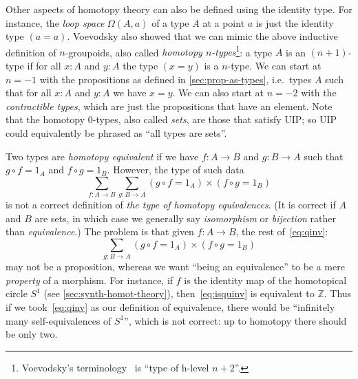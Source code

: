 \documentclass[12pt]{article}
\def\oo{\ensuremath{\infty}}
\def\io{\ensuremath{(\oo,1)}}
\def\tprod{\textstyle\prod}
\numberwithin{equation}{section}
\begin{document}
Other aspects of homotopy theory can also be defined using the identity type.
For instance, the \emph{loop space} $\Omega(A,a)$ of a type $A$ at a point $a$ is just the identity type $(a=a)$.
Voevodsky also showed that we can mimic the above inductive definition of $n$-groupoids, also called \emph{homotopy $n$-types}\footnote{Voevodsky's terminology~\cite{vv:unimath} is ``type of h-level $n+2$''.}: a type $A$ is an $(n+1)$-type if for all $x:A$ and $y:A$ the type $(x=y)$ is a $n$-type.
We can start at $n=-1$ with the propositions as defined in \cref{sec:prop-as-types}, i.e.\ types $A$ such that for all $x:A$ and $y:A$ we have $x=y$.
We can also start at $n=-2$ with the \emph{contractible types}, which are just the propositions that have an element.
Note that the homotopy $0$-types, also called \emph{sets}, are those that satisfy UIP; so UIP
could equivalently be phrased as ``all types are sets''.

Two types are \emph{homotopy equivalent} if we have $f:A\to B$ and $g:B\to A$ such that $g\circ f = 1_A$ and $f\circ g = 1_B$.
However, the type of such data
\begin{equation}
  \textstyle\sum_{f:A\to B} \sum_{g:B\to A} (g\circ f = 1_A)\times (f\circ g = 1_B)\label{eq:qinv}
\end{equation}
is not a correct definition of \emph{the type of homotopy equivalences}. %
(It is correct if $A$ and $B$ are sets, in which case we generally say \emph{isomorphism} or \emph{bijection} rather than \emph{equivalence}.)
The problem is that given $f:A\to B$, the rest of~\eqref{eq:qinv}:
\begin{equation}
  \textstyle\sum_{g:B\to A} (g\circ f = 1_A)\times (f\circ g = 1_B)\label{eq:isquinv}
\end{equation}
may not be a proposition, whereas we want ``being an equivalence'' to be a mere \emph{property} of a morphism. %
For instance, if $f$ is the identity map of the homotopical circle $S^1$ (see \cref{sec:synth-homot-theory}), then~\eqref{eq:isquinv} is equivalent to $\mathbb{Z}$.
Thus if we took~\eqref{eq:qinv} as our definition of equivalence, there would be ``infinitely many self-equivalences of $S^1$'', which is not correct: up to homotopy there should be only two.
\end{document}
